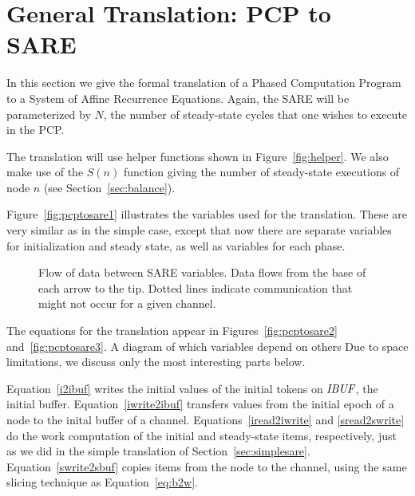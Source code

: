 \section{General Translation: PCP to SARE}
\label{sec:translate}

In this section we give the formal translation of a Phased Computation
Program to a System of Affine Recurrence Equations.  Again, the SARE
will be parameterized by $N$, the number of steady-state cycles that
one wishes to execute in the PCP.  

The translation will use helper functions shown in
Figure~\ref{fig:helper}.  We also make use of the $S(n)$ function
giving the number of steady-state executions of node $n$ (see
Section~\ref{sec:balance}).



Figure~\ref{fig:pcptosare1} illustrates the variables used for the
translation.  These are very similar as in the simple case, except
that now there are separate variables for initialization and steady
state, as well as variables for each phase.

\begin{figure}
\centering
{}
\parbox{4in}{\caption{Flow of data between SARE variables.  Data flows from the base of each arrow to the tip.  Dotted lines indicate communication that might not occur for a given channel.}
\protect\label{fig:communic}}
\end{figure}

The equations for the translation appear in
Figures~\ref{fig:pcptosare2} and~\ref{fig:pcptosare3}.  A diagram of
which variables depend on others Due to space limitations, we discuss
only the most interesting parts below.

Equation~\ref{i2ibuf} writes the initial values of the initial tokens
on $\mbox{\it IBUF}$, the initial buffer.  Equation~\ref{iwrite2ibuf}
transfers values from the initial epoch of a node to the inital buffer
of a channel.  Equations~\ref{iread2iwrite} and \ref{sread2swrite} do
the work computation of the initial and steady-state items,
respectively, just as we did in the simple translation of
Section~\ref{sec:simplesare}.  Equation~\ref{swrite2sbuf} copies items
from the node to the channel, using the same slicing technique as
Equation~\ref{eq:b2w}.

